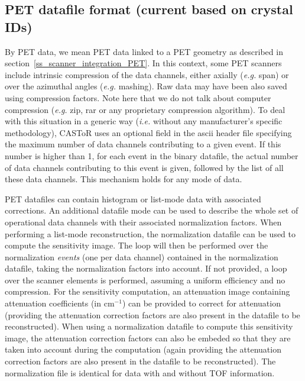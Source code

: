 \documentclass[a4paper, 11pt]{article}
\begin{document}
\subsection{PET datafile format (current based on crystal IDs)}
\label{ss_input_PET}

By PET data, we mean PET data linked to a PET geometry as described in section~\ref{ss_scanner_integration_PET}. In this context, some PET scanners
include intrinsic compression of the data channels, either axially (\textit{e.g.} span) or over the azimuthal angles (\textit{e.g.} mashing). Raw data
may have been also saved using compression factors. Note here that we do not talk about computer compression (\textit{e.g.} zip, rar or any proprietary
compression algorithm). To deal with this situation in a generic way (\textit{i.e.} without any manufacturer's specific methodology), CASToR uses
an optional field in the ascii header file specifying the maximum number of data channels contributing to a given event. If this number is
higher than 1, for each event in the binary datafile, the actual number of data channels contributing to this event is given, followed by the
list of all these data channels. This mechanism holds for any mode of data.

PET datafiles can contain histogram or list-mode data with associated corrections. An additional datafile mode can be used to describe the whole set of
operational data channels with their associated normalization factors. When performing a list-mode reconstruction, the normalization datafile can be
used to compute the sensitivity image. The loop will then be performed over the normalization \textit{events} (one per data channel) contained in the
normalization datafile, taking the normalization factors into account. If not provided, a loop over the scanner elements is performed, assuming a
uniform efficiency and no compression. For the sensitivity computation, an attenuation image containing attenuation coefficients (in cm$^{-1}$) can be
provided to correct for attenuation (providing the attenuation correction factors are also present in the datafile to be reconstructed). When using
a normalization datafile to compute this sensitivity image, the attenuation correction factors can also be embeded so that they are taken into
account during the computation (again providing the attenuation correction factors are also present in the datafile to be reconstructed). The normalization file is identical for data with and without TOF information.
\end{document}

